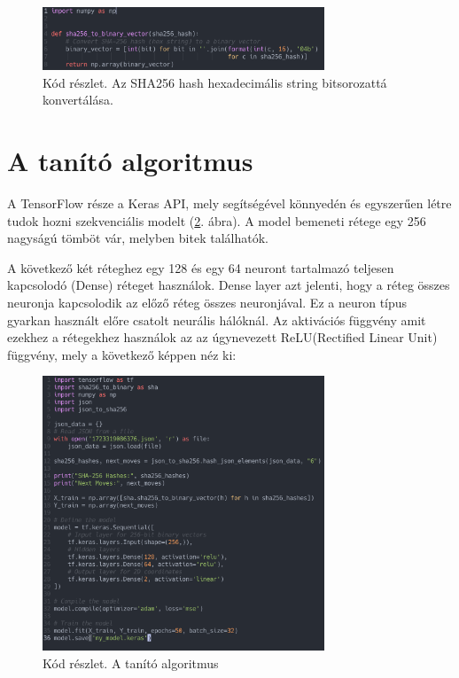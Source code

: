 \begin{figure}[h]
    \includegraphics[width=0.75\textwidth]{img/hash_to_bit.png}
    \caption{Kód részlet. Az SHA256 hash hexadecimális string bitsorozattá konvertálása.}
    \label{code:hash_to_bit}
\end{figure}

\section{A tanító algoritmus}

A TensorFlow része a Keras API, mely segítségével könnyedén és egyszerűen létre tudok hozni szekvenciális modelt (\ref{code:tensor}. ábra). A model bemeneti rétege egy 256 nagyságú tömböt vár, melyben bitek találhatók. 

A következő két réteghez egy 128 és egy 64 neuront tartalmazó teljesen kapcsolodó (Dense) réteget használok. Dense layer azt jelenti, hogy a réteg összes neuronja kapcsolodik az előző réteg összes neuronjával. Ez a neuron típus gyarkan használt előre csatolt neurális hálóknál. Az aktivációs függvény amit ezekhez a rétegekhez használok az az úgynevezett ReLU(Rectified Linear Unit) függvény, mely a következő képpen néz ki: 
\ 
\begin{figure}[h]
    \includegraphics[width=0.75\textwidth]{img/Tensor.png}
    \caption{Kód részlet. A tanító algoritmus}
    \label{code:tensor}
\end{figure}